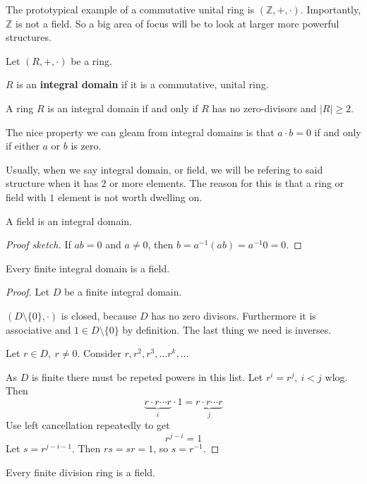 The prototypical example of a commutative unital ring 
is $(\mathbb Z, +, \cdot)$. Importantly, $\mathbb Z$ is not 
a field. So a big area of focus will be to look at larger 
more powerful structures. 

\begin{defn}
    Let $(R,+,\cdot)$ be a ring. 

    $R$ is an \textbf{integral domain} if it is a commutative, 
    unital ring. 
\end{defn}
\begin{prop}
    A ring $R$ is an integral domain if and only if 
    $R$ has no zero-divisors and $|R| \geq 2$. 
\end{prop}
The nice property we can gleam from integral domains is that 
$a\cdot b = 0$ if and only if either $a$ or $b$ is zero.  

Usually, when we say integral domain, or field, we will be refering 
to said structure when it has $2$ or more elements. 
The reason for this is that a ring or field with 
$1$ element is not worth dwelling on. 

\begin{prop}
    A field is an integral domain. 
\end{prop}
\begin{proof}[Proof sketch]
    If $ab = 0$ and $a \neq 0$, then $b = a^{-1}(ab) = a^{-1}0 = 0$. 
\end{proof}

\begin{thm}
    Every finite integral domain is a field.
\end{thm}
\begin{proof}
    Let $D$ be a finite integral domain. 

    $(D\setminus \{0\},\cdot)$ is closed, because $D$ has no 
    zero divisors. Furthermore it is associative and $1 \in D 
    \setminus \{0\}$ by definition. The last thing we need 
    is inverses. 

    Let $r \in D, \: r \neq 0$. 
    Consider $r, r^2, r^3, \ldots r^k, \ldots$ 

    As $D$ is finite there must be repeted powers in this list. 
    Let $r^i = r^j, \: i < j$ wlog. Then 
    \[
        \underbrace{r\cdot r\cdots r}_{i} \cdot 1 = 
        \underbrace{r\cdot r \cdots r}_{j}
    \]
    Use left cancellation repeatedly to get 
    \[
        r^{j-i} = 1
    \]
    Let $s = r^{j-i-1}$. Then $rs = sr = 1$, so $s = r^{-1}$.
\end{proof}
\begin{thm}
    Every finite division ring is a field. 
\end{thm}

